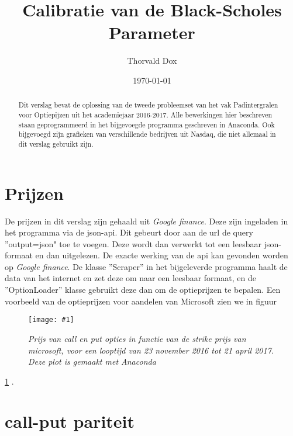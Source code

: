 \documentclass[%
 aip,
 jmp,%
 amsmath,amssymb,
 reprint,%
]{revtex4-1}
\newcommand{\quickfigure}[2]{
\begin{figure}[t]
\texttt{[image: \#1]}
\caption{\textit{#2 Deze plot is gemaakt met Anaconda\citep{anaconda}}\label{fig:#1}}
\end{figure}
\ref{fig:#1}
}
\begin{document}

\title[Calibratie van de Black-Scholes Parameter]{Calibratie van de Black-Scholes Parameter}%
\author{Thorvald Dox}
%
\date{\today}%
             
\begin{abstract}
Dit verslag bevat de oplossing van de tweede probleemset van het vak Padintergralen voor Optiepijzen uit het academiejaar 2016-2017. Alle bewerkingen hier beschreven staan geprogrammeerd in het bijgevoegde programma geschreven in Anaconda\cite{anaconda}. Ook bijgevoegd zijn grafieken van verschillende bedrijven uit Nasdaq\cite{nasdaq}, die niet allemaal in dit verslag gebruikt zijn. 
\end{abstract}

\pacs{}%
\keywords{}%
\maketitle

\section{Prijzen}

De prijzen in dit verslag zijn gehaald uit \textit{Google finance}\cite{gf}. Deze zijn ingeladen in het programma
via de json-api. Dit gebeurt door aan de url de query ''output=json" toe te voegen. Deze wordt dan verwerkt tot een leesbaar json-formaat en dan uitgelezen. De exacte werking van de api kan gevonden worden op \textit{Google finance}\cite{gf}. De klasse ''Scraper'' in het bijgeleverde programma haalt de data van het internet en zet deze om naar een leesbaar formaat, en de ''OptionLoader'' klasse gebruikt deze dan om de optieprijzen te bepalen. Een voorbeeld van de optieprijzen voor aandelen van Microsoft zien we in figuur \quickfigure{option_price_MSFT_2017-04-21.png}{Prijs van call en put opties in functie van de strike prijs van microsoft, voor een looptijd van 23 november 2016 tot 21 april 2017.}.

\section{call-put pariteit}
\end{document}
